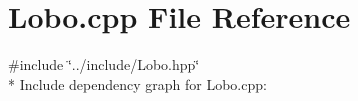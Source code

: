 \section{Lobo.\+cpp File Reference}
\label{_lobo_8cpp}
{\ttfamily \#include \char`\"{}../include/\+Lobo.\+hpp\char`\"{}}\\*
Include dependency graph for Lobo.\+cpp\+:

